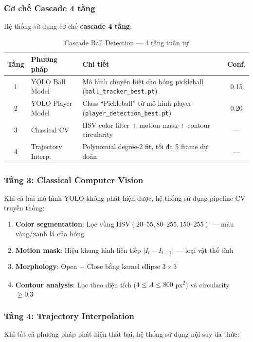 \documentclass[12pt,a4paper]{article}
\begin{document}
\subsubsection{Cơ chế Cascade 4 tầng}
Hệ thống sử dụng cơ chế \textbf{cascade 4 tầng}:

\begin{table}[H]
\centering
\caption{Cascade Ball Detection --- 4 tầng tuần tự}
\label{tab:cascade}
\begin{tabularx}{\textwidth}{c l X c}
\toprule
\textbf{Tầng} & \textbf{Phương pháp} & \textbf{Chi tiết} & \textbf{Conf.} \\
\midrule
1 & YOLO Ball Model & Mô hình chuyên biệt cho bóng pickleball (\texttt{ball\_tracker\_best.pt}) & 0.15 \\
2 & YOLO Player Model & Class ``Pickleball'' từ mô hình player (\texttt{player\_detection\_best.pt}) & 0.20 \\
3 & Classical CV & HSV color filter + motion mask + contour circularity & --- \\
4 & Trajectory Interp. & Polynomial degree-2 fit, tối đa 5 frame dự đoán & --- \\
\bottomrule
\end{tabularx}
\end{table}

\subsubsection{Tầng 3: Classical Computer Vision}
Khi cả hai mô hình YOLO không phát hiện được, hệ thống sử dụng pipeline CV truyền thống:
\begin{enumerate}[noitemsep]
    \item \textbf{Color segmentation}: Lọc vùng HSV$(20\text{--}55, 80\text{--}255, 150\text{--}255)$ --- màu vàng/xanh lá của bóng
    \item \textbf{Motion mask}: Hiệu khung hình liên tiếp $|I_t - I_{t-1}|$ --- loại vật thể tĩnh
    \item \textbf{Morphology}: Open + Close bằng kernel ellipse $3\times3$
    \item \textbf{Contour analysis}: Lọc theo diện tích ($4 \leq A \leq 800$ px\textsuperscript{2}) và circularity $\geq 0.3$
\end{enumerate}

\subsubsection{Tầng 4: Trajectory Interpolation}
Khi tất cả phương pháp phát hiện thất bại, hệ thống sử dụng nội suy đa thức:
\end{document}
